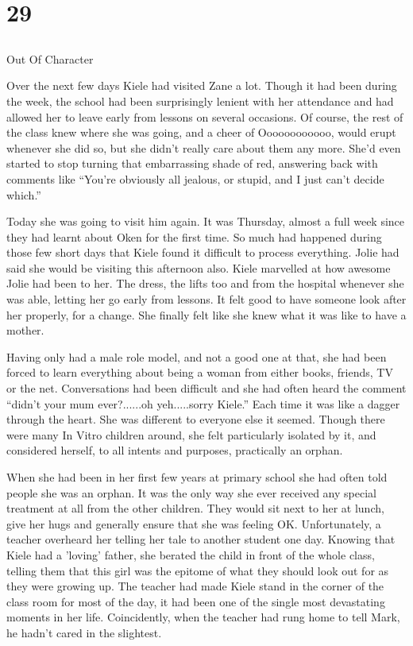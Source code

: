 \chapter{29}
\section{}
Out Of Character  

Over the next few days Kiele had visited Zane a lot.  Though it had been during the week, the school had been surprisingly lenient with her attendance and had allowed her to leave early from lessons on several occasions.  Of course, the rest of the class knew where she was going, and a cheer of Oooooooooooo, would erupt whenever she did so, but she didn't really care about them any more.  She'd even started to stop turning that embarrassing shade of red, answering back with comments like ``You're obviously all jealous, or stupid, and I just can't decide which.''

Today she was going to visit him again.  It was Thursday, almost a full week since they had learnt about Oken for the first time.  So much had happened during those few short days that Kiele found it difficult to process everything.  Jolie had said she would be visiting this afternoon also.  Kiele marvelled at how awesome Jolie had been to her.  The dress, the lifts too and from the hospital whenever she was able, letting her go early from lessons.  It felt good to have someone look after her properly, for a change.  She finally felt like she knew what it was like to have a mother.

Having only had a male role model, and not a good one at that, she had been forced to learn everything about being a woman from either books, friends, TV or the net.  Conversations had been difficult and she had often heard the comment ``didn't your mum ever?......oh yeh.....sorry Kiele.''  Each time it was like a dagger through the heart.  She was different to everyone else it seemed.  Though there were many In Vitro children around, she felt particularly isolated by it, and considered herself, to all intents and purposes,  practically an orphan.

When she had been in her first few years at primary school she had often told people she was an orphan.  It was the only way she ever received any special treatment at all from the other children.  They would sit next to her at lunch, give her hugs and generally ensure that she was feeling OK.  Unfortunately, a teacher overheard her telling her tale to another student one day.  Knowing that Kiele had a 'loving' father, she berated the child in front of the whole class, telling them that this girl was the epitome of what they should look out for as they were growing up.  The teacher had made Kiele stand in the corner of the class room for most of the day, it had been one of the single most devastating moments in her life.  Coincidently, when the teacher had rung home to tell Mark, he hadn't cared in the slightest.

